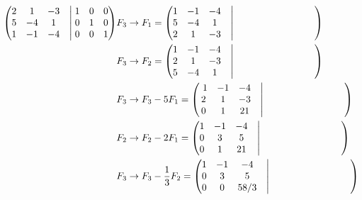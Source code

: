 \begin{ejem}
\begin{align*}
     \begin{pmatrix}  2 & 1 & -3 &\bigm| 1&0 &0  \\ 5  & -4 & 1 &\bigm| 0&1 &0\\ 1 & -1 & -4  &\bigm| 0&0 &1\end{pmatrix} & F_3 \rightarrow F_1 = \begin{pmatrix}  1 & -1 & -4 &\bigm| \hspace*{3cm} \\ 5  & -4 & 1 &\bigm| \hspace*{3cm} \\ 2 & 1 & -3 &\bigm| \hspace*{3cm}\end{pmatrix} \\
     & F_3 \rightarrow F_2 =  \begin{pmatrix}  1 & -1 & -4 &\bigm| \hspace*{3cm} \\ 2 & 1 & -3 &\bigm| \hspace*{3cm} \\ 5  & -4 & 1 &\bigm| \hspace*{3cm} \end{pmatrix} \\
     &F_3 \rightarrow F_3 - 5F_1 = \begin{pmatrix} \ 1 & -1 & -4 &\bigm| \hspace*{3cm}  \\ 2 & 1 & -3 &\bigm| \hspace*{3cm}\\  0 & 1 & 21 &\bigm| \hspace*{3cm}  \end{pmatrix} \\
     &F_2 \rightarrow F_2 - 2F_1 = \begin{pmatrix}  1 & -1 & -4 &\bigm| \hspace*{3cm} \\ 0 & 3 & 5 &\bigm| \hspace*{3cm} \\  0 & 1 & 21 &\bigm| \hspace*{3cm} \end{pmatrix} \\
     &F_3 \rightarrow F_3 - \frac{1}{3} F_2 = \begin{pmatrix}  1 & -1 & -4 &\bigm| \hspace*{3cm} \\ 0 & 3 & 5 &\bigm| \hspace*{3cm} \\  0 & 0 & 58/3 &\bigm| \hspace*{3cm} \end{pmatrix}\\

\end{align*}
\end{ejem}
